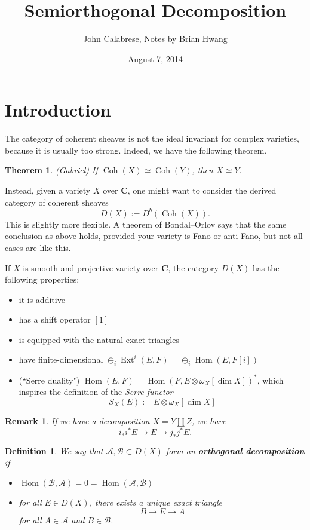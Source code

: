 \documentclass{amsart}
\title{Semiorthogonal Decomposition}
\author{John Calabrese, Notes by Brian Hwang}
\date{August 7, 2014}
\newtheorem*{thm}{Theorem}
\newtheorem*{defn}{Definition}
\newtheorem*{rem}{Remark}
\newcommand{\A}{\mathcal{A}}
\newcommand{\B}{\mathcal{B}}
\newcommand{\CC}{\textbf{C}}
\DeclareMathOperator{\Coh}{Coh}
\DeclareMathOperator{\Ext}{Ext}
\DeclareMathOperator{\Hom}{Hom}
\begin{document}
\maketitle

\section{Introduction}

The category of coherent sheaves is not the ideal invariant for complex varieties, because it is usually too strong. Indeed, we have the following theorem.

\begin{thm}
(Gabriel) If $\Coh(X) \simeq \Coh(Y)$, then $X \simeq Y$.
\end{thm}

Instead, given a variety $X$ over $\CC$, one might want to consider the derived category of coherent sheaves
\[
D(X) := D^b(\Coh(X)).
\]
This is slightly more flexible. A theorem of Bondal--Orlov says that the same conclusion as above holds, provided your variety is Fano or anti-Fano, but not all cases are like this.

If $X$ is smooth and projective variety over $\CC$, the category $D(X)$ has the following properties:
\begin{itemize}
  \item{it is additive}
  \item{has a shift operator $[1]$}
  \item{is equipped with the natural exact triangles}
  \item{have finite-dimensional $\oplus_i \Ext^i(E,F) = \oplus_i \Hom(E, F[i])$}
  \item{(``Serre duality") $\Hom(E,F) = \Hom(F, E \otimes \omega_X[\dim X])^*$, which inspires the definition of the \textit{Serre functor}
  \[
  S_X(E) := E \otimes \omega_X[\dim X]
  \]}
\end{itemize}

\begin{rem}
If we have a decomposition $X = Y \amalg Z$, we have
\[
i_* i^* E \to E \to j_* j^* E.
\]
\end{rem}

\begin{defn}
We say that $\A, \B \subset D(X)$ form an \textbf{orthogonal decomposition} if
\begin{itemize}  
  \item{$\Hom(\B, \A) = 0 = \Hom(\A, \B)$}
  \item{for all $E \in D(X)$, there exists a unique exact triangle
  \[
  B \to E \to A
  \]
  for all $A \in \A$ and $B \in \B$.}
\end{itemize}
\end{defn}
\end{document}
